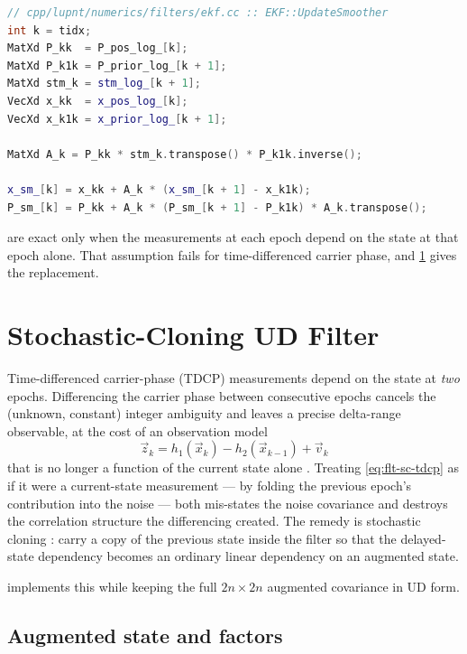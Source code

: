 \begin{lstlisting}[language=cpp, caption={RTS backward recursion.},
                   label={lst:flt-smoother}]
// cpp/lupnt/numerics/filters/ekf.cc :: EKF::UpdateSmoother
int k = tidx;
MatXd P_kk  = P_pos_log_[k];
MatXd P_k1k = P_prior_log_[k + 1];
MatXd stm_k = stm_log_[k + 1];
VecXd x_kk  = x_pos_log_[k];
VecXd x_k1k = x_prior_log_[k + 1];

MatXd A_k = P_kk * stm_k.transpose() * P_k1k.inverse();

x_sm_[k] = x_kk + A_k * (x_sm_[k + 1] - x_k1k);
P_sm_[k] = P_kk + A_k * (P_sm_[k + 1] - P_k1k) * A_k.transpose();
\end{lstlisting}

 are exact only when the
measurements at each epoch depend on the state at that epoch alone. That
assumption fails for time-differenced carrier phase, and \cref{sec:flt-cloning}
gives the replacement.

\section{Stochastic-Cloning UD Filter}
\label{sec:flt-cloning}

Time-differenced carrier-phase (TDCP) measurements depend on the state at
\emph{two} epochs. Differencing the carrier phase between consecutive epochs
cancels the (unknown, constant) integer ambiguity and leaves a precise
delta-range observable, at the cost of an observation model
\begin{equation}
  \label{eq:flt-sc-tdcp}
  \vec{z}_{k} = h_1(\vec{x}_{k}) - h_2(\vec{x}_{k-1}) + \vec{v}_{k}
\end{equation}
that is no longer a function of the current state alone
\citep{iiyama2024navi,iiyama2026scud}. Treating \cref{eq:flt-sc-tdcp} as if it
were a current-state measurement --- by folding the previous epoch's
contribution into the noise --- both mis-states the noise covariance and
destroys the correlation structure the differencing created. The remedy is
stochastic cloning \citep{roumeliotis2002cloning}: carry a copy of the previous
state inside the filter so that the delayed-state dependency becomes an
ordinary linear dependency on an augmented state.

 implements this while keeping the full
$2n \times 2n$ augmented covariance in UD form.

\subsection{Augmented state and factors}

